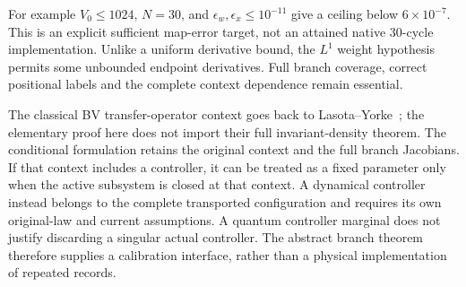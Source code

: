 \documentclass[11pt]{article}
\numberwithin{equation}{section}
\theoremstyle{definition}
\theoremstyle{remark}
\begin{document}
For example $V_0\leq1024$, $N=30$, and
$\epsilon_w,\epsilon_x\leq10^{-11}$ give a ceiling below
$6\times10^{-7}$. This is an explicit sufficient map-error target, not an
attained native 30-cycle implementation. Unlike a uniform derivative
bound, the $L^1$ weight hypothesis permits some unbounded endpoint
derivatives. Full branch coverage, correct positional labels and the
complete context dependence remain essential.

The classical BV transfer-operator context goes back to
Lasota--Yorke~\cite{LasotaYorke1973}; the elementary proof here does not
import their full invariant-density theorem. The conditional formulation
retains the original context and the full branch Jacobians. If that
context includes a controller, it can be treated as a fixed parameter
only when the active subsystem is closed at that context. A dynamical
controller instead belongs to the complete transported configuration and
requires its own original-law and current assumptions. A quantum
controller marginal does not justify discarding a singular actual
controller. The abstract branch theorem therefore supplies a calibration
interface, rather than a physical implementation of repeated records.
\end{document}
